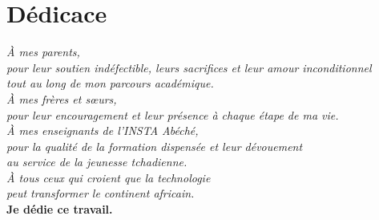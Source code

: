 \chapter*{Dédicace}

\vspace*{3cm}

\begin{center}
\textit{\Large À mes parents,}\\[0.5cm]
\textit{pour leur soutien indéfectible, leurs sacrifices et leur amour inconditionnel\\
tout au long de mon parcours académique.}\\[1.5cm]

\textit{\Large À mes frères et sœurs,}\\[0.5cm]
\textit{pour leur encouragement et leur présence à chaque étape de ma vie.}\\[1.5cm]

\textit{\Large À mes enseignants de l'INSTA Abéché,}\\[0.5cm]
\textit{pour la qualité de la formation dispensée et leur dévouement\\
au service de la jeunesse tchadienne.}\\[1.5cm]

\textit{\Large À tous ceux qui croient que la technologie\\
peut transformer le continent africain.}\\[2cm]

\vspace{1cm}
\textbf{Je dédie ce travail.}
\end{center}